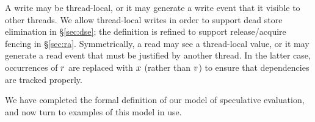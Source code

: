 A write may be thread-local, or it may generate a write event that it visible
to other threads.  We allow thread-local writes in order to support dead
store elimination in \S\ref{sec:dse}; the definition is refined to support
release/acquire fencing in \S\ref{sec:ra}.  Symmetrically, a read may see a
thread-local value, or it may generate a read event that must be justified by
another thread.  In the latter case, occurrences of $r$ are replaced with
$x$ (rather than $v$) to ensure that dependencies are tracked
properly.

We have completed the formal definition of our model of speculative
evaluation, and now turn to examples of this model in use.
